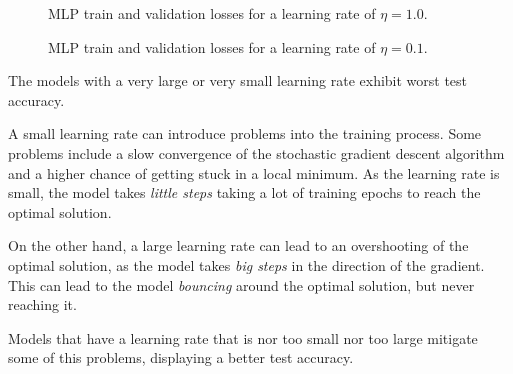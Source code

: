 \documentclass[12pt]{article}
\begin{document}
\begin{enumerate}[leftmargin=\labelsep]
\begin{enumerate}[label=\alph*)]
                    \begin{figure}[H]
                        \centering
                        
                        \caption{MLP train and validation losses for a learning rate of $\eta = 1.0$.}
                        \label{fig:q2-mlp-training-loss-batch-16-lr-1.0-epochs-20-l2-0.0-opt-sgd}
                    \end{figure}

                    \begin{figure}[H]
                        \centering
                        
                        \caption{MLP train and validation losses for a learning rate of $\eta = 0.1$.}
                        \label{fig:q2-mlp-training-loss-batch-16-lr-0.1-epochs-20-l2-0.0-opt-sgd}
                    \end{figure}

                    The models with a very large or very small learning rate exhibit worst test accuracy.

                    \vspace{12pt}

                    A small learning rate can introduce problems into the training process. Some problems include a slow convergence of the stochastic gradient descent algorithm and a higher chance of getting stuck in a local minimum. As the learning rate is small, the model takes \textit{little steps} taking a lot of training epochs to reach the optimal solution.

                    \vspace{12pt}

                    On the other hand, a large learning rate can lead to an overshooting of the optimal solution, as the model takes \textit{big steps} in the direction of the gradient. This can lead to the model \textit{bouncing} around the optimal solution, but never reaching it.

                    \vspace{12pt}

                    Models that have a learning rate that is nor too small nor too large mitigate some of this problems, displaying a better test accuracy.


\end{enumerate}
\end{enumerate}
\end{document}
